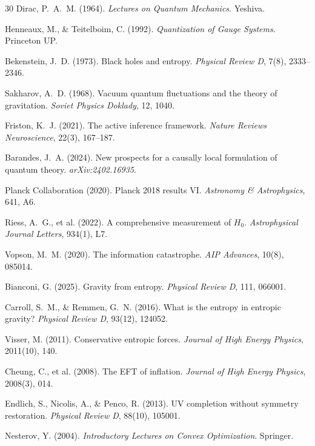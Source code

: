 \documentclass[12pt, oneside]{book}
\theoremstyle{plain}
\theoremstyle{definition}
\begin{document}
\begin{thebibliography}{30}
Dirac, P.~A.~M. (1964). \textit{Lectures on Quantum Mechanics}. Yeshiva.

Henneaux, M., \& Teitelboim, C. (1992). \textit{Quantization of Gauge Systems}.
Princeton UP.

Bekenstein, J.~D. (1973). Black holes and entropy.
\textit{Physical Review D}, 7(8), 2333--2346.

Sakharov, A.~D. (1968). Vacuum quantum fluctuations and the theory of gravitation.
\textit{Soviet Physics Doklady}, 12, 1040.

Friston, K.~J. (2021). The active inference framework.
\textit{Nature Reviews Neuroscience}, 22(3), 167--187.

Barandes, J.~A. (2024). New prospects for a causally local formulation of quantum
theory. \textit{arXiv:2402.16935}.

Planck Collaboration (2020). Planck 2018 results VI.
\textit{Astronomy \& Astrophysics}, 641, A6.

Riess, A.~G., et al. (2022). A comprehensive measurement of $H_0$.
\textit{Astrophysical Journal Letters}, 934(1), L7.

Vopson, M.~M. (2020). The information catastrophe.
\textit{AIP Advances}, 10(8), 085014.

Bianconi, G. (2025). Gravity from entropy.
\textit{Physical Review D}, 111, 066001.

Carroll, S.~M., \& Remmen, G.~N. (2016). What is the entropy in entropic gravity?
\textit{Physical Review D}, 93(12), 124052.

Visser, M. (2011). Conservative entropic forces.
\textit{Journal of High Energy Physics}, 2011(10), 140.

Cheung, C., et al. (2008). The EFT of inflation.
\textit{Journal of High Energy Physics}, 2008(3), 014.

Endlich, S., Nicolis, A., \& Penco, R. (2013). UV completion without symmetry
restoration. \textit{Physical Review D}, 88(10), 105001.

Nesterov, Y. (2004). \textit{Introductory Lectures on Convex Optimization}.
Springer.

\end{thebibliography}
\end{document}
